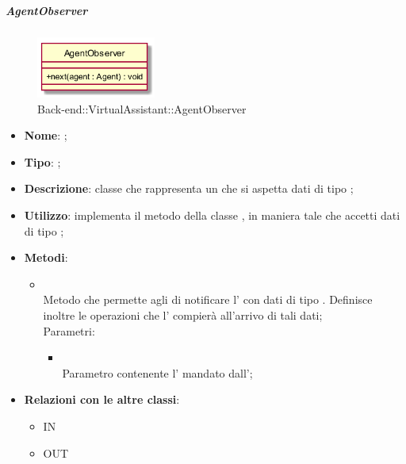 \hypertarget{AgentObserver_label}{\subparagraph{AgentObserver}}
\begin{figure}[h]
	\centering
	\includegraphics[width=0.35\textwidth,height=\textheight,keepaspectratio]{images/ClassAgentObserver.png}
	\caption{Back-end::VirtualAssistant::AgentObserver}
\end{figure}
\begin{itemize}
	\item \textbf{Nome}: ;
	\item \textbf{Tipo}: ;
	\item \textbf{Descrizione}: classe che rappresenta un  che si aspetta dati di tipo ;
	\item \textbf{Utilizzo}: implementa il metodo  della classe , in maniera tale che accetti dati di tipo ;
	\item \textbf{Metodi}:
	\begin{itemize}
		\item[]  \\		Metodo che permette agli  di notificare l' con dati di tipo . Definisce inoltre le operazioni che l' compierà all'arrivo di tali dati;\\
		Parametri:
		\begin{itemize}
			\item {} \\
			Parametro contenente l' mandato dall';
		\end{itemize}
	\end{itemize}
	\item \textbf{Relazioni con le altre classi}:
	\begin{itemize}
		\item IN \hyperlink{AgentObservable_label}{}
		\item OUT \hyperlink{Agent_label}{}
	\end{itemize}
\end{itemize}
\FloatBarrier

